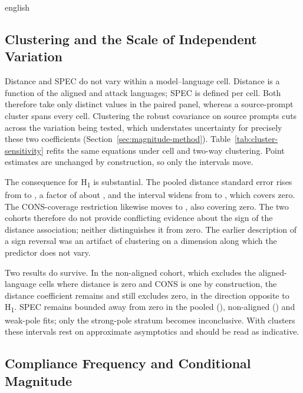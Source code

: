 \begin{otherlanguage*}{english}
\subsection{Clustering and the Scale of Independent Variation}
\label{sec:cluster-sensitivity}

Distance and SPEC do not vary within a model--language cell. Distance is a function of the aligned and attack languages; SPEC is defined per cell. Both therefore take only \RNumCells{} distinct values in the paired panel, whereas a source-prompt cluster spans every cell. Clustering the robust covariance on source prompts cuts across the variation being tested, which understates uncertainty for precisely these two coefficients (Section~\ref{sec:magnitude-method}). Table~\ref{tab:cluster-sensitivity} refits the same equations under cell and two-way clustering. Point estimates are unchanged by construction, so only the intervals move.

\RClusterSensitivityTable

The consequence for H\textsubscript{1} is substantial. The pooled distance standard error rises from \RDistancePromptSE{} to \RDistanceCellSE{}, a factor of about \RSEInflation{}, and the interval widens from \RDistancePromptInterval{} to \RDistanceCellInterval{}, which covers zero. The CONS-coverage restriction likewise moves to \RConsDistanceCellInterval{}, also covering zero. The two cohorts therefore do not provide conflicting evidence about the sign of the distance association; neither distinguishes it from zero. The earlier description of a sign reversal was an artifact of clustering on a dimension along which the predictor does not vary.

Two results do survive. In the non-aligned cohort, which excludes the aligned-language cells where distance is zero and CONS is one by construction, the distance coefficient remains \RNonAlignedDistanceCellInterval{} and still excludes zero, in the direction opposite to H\textsubscript{1}. SPEC remains bounded away from zero in the pooled (\RSpecCellInterval{}), non-aligned (\RNonAlignedSpecCellInterval{}) and weak-pole fits; only the strong-pole stratum becomes inconclusive. With \RNumCells{} clusters these intervals rest on approximate asymptotics and should be read as indicative.

\subsection{Compliance Frequency and Conditional Magnitude}
\label{sec:outcome-decomposition-results}


\end{otherlanguage*}

